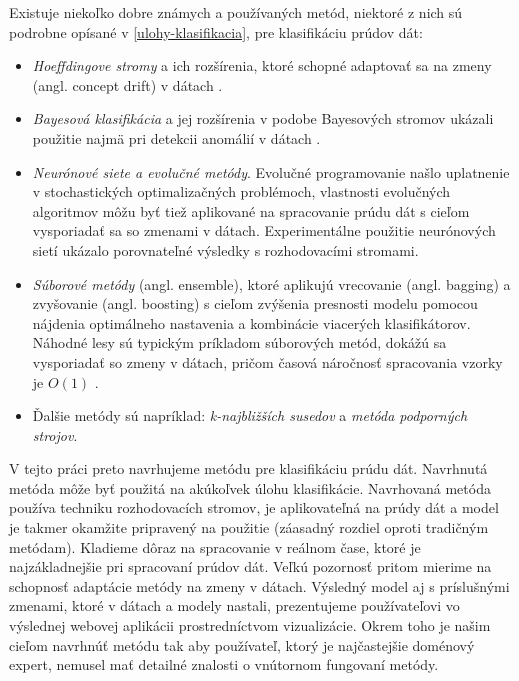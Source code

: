 \par
Existuje niekoľko dobre známych a používaných metód, niektoré z nich sú podrobne opísané v \ref{ulohy-klasifikacia}, pre klasifikáciu prúdov dát:
\begin{itemize}
	\item \textit{Hoeffdingove stromy} a ich rozšírenia, ktoré schopné adaptovať sa na zmeny (angl. concept drift) v dátach \citep{hulten2001mining, bifet2009adaptive}.
	\item \textit{Bayesová klasifikácia} a jej rozšírenia v podobe Bayesových stromov ukázali použitie najmä pri detekcii anomálií v dátach \citep{hill2007real}.
	\item \textit{Neurónové siete a evolučné metódy}. Evolučné programovanie našlo uplatnenie v stochastických optimalizačných problémoch, vlastnosti evolučných algoritmov môžu byť tiež aplikované na spracovanie prúdu dát s cieľom vysporiadať sa so zmenami v dátach. Experimentálne použitie neurónových sietí ukázalo porovnateľné výsledky s rozhodovacími stromami.
	\item \textit{Súborové metódy} (angl. ensemble), ktoré aplikujú vrecovanie (angl. bagging) a zvyšovanie (angl. boosting) s cieľom zvýšenia presnosti modelu pomocou nájdenia optimálneho nastavenia a kombinácie viacerých klasifikátorov. Náhodné lesy sú typickým príkladom súborových metód, dokážú sa vysporiadať so zmeny v dátach, pričom časová náročnosť spracovania vzorky je $O(1)$ \citep{abdulsalam2011classification}.
	\item Ďalšie metódy sú napríklad: \textit{k-najbližších susedov} a \textit{metóda podporných strojov}.
\end{itemize}

V tejto práci preto navrhujeme metódu pre klasifikáciu prúdu dát. Navrhnutá metóda môže byť použitá na akúkoľvek úlohu klasifikácie. Navrhovaná metóda používa techniku rozhodovacích stromov, je aplikovateľná na prúdy dát a model je takmer okamžite pripravený na použitie (záasadný rozdiel oproti tradičným metódam). Kladieme dôraz na spracovanie v reálnom čase, ktoré je najzákladnejšie pri spracovaní prúdov dát. Veľkú pozornosť pritom mierime na schopnosť adaptácie metódy na zmeny v dátach. Výsledný model aj s príslušnými zmenami, ktoré v dátach a modely nastali, prezentujeme používateľovi vo výslednej webovej aplikácii prostredníctvom vizualizácie. Okrem toho je našim cieľom navrhnúť metódu tak aby používateľ, ktorý je najčastejšie doménový expert, nemusel mať detailné znalosti o vnútornom fungovaní metódy.


